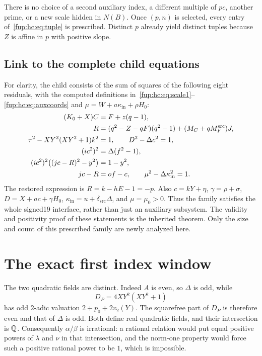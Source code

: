 \documentclass[11pt,letterpaper]{article}
\theoremstyle{definition}\newtheorem{definition}[theorem]{Definition}
\theoremstyle{remark}\newtheorem{remark}[theorem]{Remark}
\newcommand{\MFsrc}{M_F^{\mathrm{src}}}
\newcommand{\dsrc}{\delta_{\mathrm{src}}}
\newcommand{\kin}{\kappa_{\mathrm{in}}}
\begin{document}
There is no choice of a second auxiliary index, a different multiple of $pc$, another prime, or a new scale hidden in $N(B)$. Once $(p,n)$ is selected, every entry of~\eqref{fup:hc:eq:tuple} is prescribed. Distinct $p$ already yield distinct tuples because $Z$ is affine in $p$ with positive slope.

\subsection{Link to the complete child equations}
For clarity, the child consists of the sum of squares of the following eight residuals, with the computed definitions in~\eqref{fup:hc:eq:scale1}--\eqref{fup:hc:eq:auxcoords} and $\mu=W+a\kin+\rho H_0$:
\begin{align}\label{fup:hc:eq:child}
 (K_0+X)C&=F+z(q-1),\notag\\
 R&=(q^2-Z-qF)(q^2-1)+(M_C+q\MFsrc)J,\notag\\
 \tau^2-XY^2(XY^2+1)k^2&=1,\qquad D^2-\Delta c^2=1,\notag\\
 (ic^2)^2&=\Delta(f^2-1),\\
 (ic^2)^2\bigl((jc-R)^2-y^2\bigr)&=1-y^2,\notag\\
 jc-R&=of-c,\qquad \mu^2-\Delta\kin^2=1.\notag
\end{align}
The restored expression is $R=k-hE-1=-p$. Also $c=kY+\eta$, $\gamma=\rho+\sigma$, $D=X+ac+\gamma H_0$, $\kin=u+\dsrc\Delta$, and $\mu=\mu_0>0$. Thus the family satisfies the whole signed19 interface, rather than just an auxiliary subsystem. The validity and positivity proof of these statements is the inherited theorem. Only the size and count of this prescribed family are newly analyzed here.

\section{The exact first index window}\label{fup:hc:sec:window}
The two quadratic fields are distinct. Indeed $A$ is even, so $\Delta$ is odd, while
\[
 D_P=4XY^2(XY^2+1)
\]
has odd $2$-adic valuation $2+p_0+2v_2(Y)$. The squarefree part of $D_P$ is therefore even and that of $\Delta$ is odd. Both define real quadratic fields, and their intersection is $\mathbb Q$. Consequently $\alpha/\beta$ is irrational: a rational relation would put equal positive powers of $\lambda$ and $\nu$ in that intersection, and the norm-one property would force such a positive rational power to be $1$, which is impossible.
\end{document}
